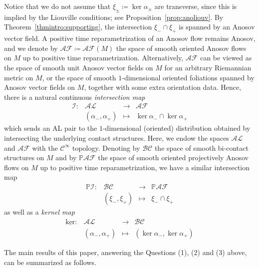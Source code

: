 \documentclass[letterpaper, 11pt]{article}
\numberwithin{equation}{section}
\begin{document}
Notice that we do not assume that $\xi_\pm \coloneqq \ker \alpha_\pm$ are transverse, since this is implied by the Liouville conditions; see Proposition~\ref{prop:anoliouv}. By Theorem~\ref{thmintro:supporting}, the intersection $\xi_- \cap \xi_+$ is spanned by an Anosov vector field. A positive time reparametrization of an Anosov flow remains Anosov, and we denote by $\mathcal{AF} \coloneqq \mathcal{AF}(M)$ the space of smooth oriented Anosov flows on $M$ up to positive time reparametrization. Alternatively, $\mathcal{AF}$ can be viewed as the space of smooth unit Anosov vector fields on $M$ for an arbitrary Riemannian metric on $M$, or the space of smooth $1$-dimensional oriented foliations spanned by Anosov vector fields on $M$, together with some extra orientation data. Hence, there is a natural continuous \emph{intersection map}
$$
\begin{array}{rccc}
\mathcal{I} : & \mathcal{AL} & \longrightarrow & \mathcal{AF} \\
		   & (\alpha_-, \alpha_+) & \longmapsto & \ker \alpha_- \cap \ker \alpha_+
\end{array} $$
which sends an AL pair to the $1$-dimensional (oriented) distribution obtained by intersecting the underlying contact structures. Here, we endow the spaces $\mathcal{AL}$ and $\mathcal{AF}$ with the $\mathcal{C}^\infty$ topology. Denoting by $\mathcal{BC}$ the space of smooth bi-contact structures on $M$ and by $\mathbb{P}\mathcal{AF}$ the space of smooth oriented projectively Anosov flows on $M$ up to positive time reparametrization, we have a similar intersection map
$$
\begin{array}{rccc}
\mathbb{P}\mathcal{I} : & \mathcal{BC} & \longrightarrow & \mathbb{P}\mathcal{AF} \\
		   & (\xi_-, \xi_+) & \longmapsto & \xi_- \cap \xi_+
\end{array} $$
as well as a \emph{kernel map}
$$
\begin{array}{rccc}
\underline{\mathrm{ker}} : & \mathcal{AL} & \longrightarrow & \mathcal{BC} \\
		   & (\alpha_-, \alpha_+) & \longmapsto & (\ker \alpha_-, \ker \alpha_+)
\end{array} $$

The main results of this paper, answering the Questions (1), (2) and (3) above, can be summarized as follows.
\end{document}
